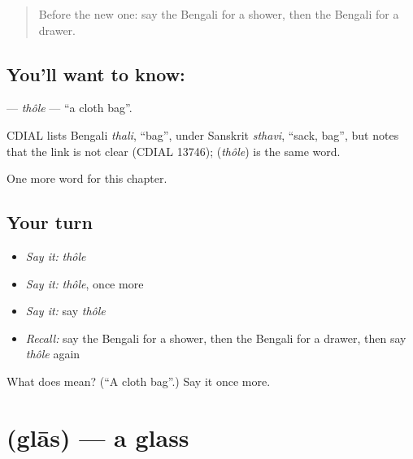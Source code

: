 \label{lesson:BN-C201-thole}



\begin{quote}
Before the new one: say the Bengali for a shower, then the Bengali for a drawer.
\end{quote}

\subsection*{You'll want to know: }
\textbf{} — \emph{thôle} — \textquotedblleft{}a cloth bag\textquotedblright{}.

\begin{cousinweb}
CDIAL lists Bengali \emph{thali}, \textquotedblleft{}bag\textquotedblright{}, under Sanskrit \emph{sthavi}, \textquotedblleft{}sack, bag\textquotedblright{}, but notes that the link is not clear (CDIAL 13746); \textbf{} (\emph{thôle}) is the same word.
\end{cousinweb}

\begin{grammarlens}[title={What you've built}]
One more word for this chapter.
\end{grammarlens}

\subsection*{Your turn}
\begin{itemize}
\raggedright
  \item \emph{Say it:} \emph{thôle}
  \item \emph{Say it:} \emph{thôle}, once more
  \item \emph{Say it:} say \emph{thôle}
  \item \emph{Recall:} say the Bengali for a shower, then the Bengali for a drawer, then say \emph{thôle} again
\end{itemize}

\begin{tcolorbox}[breakable,colback=teal!4,colframe=teal!35!black,title={Before you move on}]
What does  mean? (\textquotedblleft{}A cloth bag\textquotedblright{}.) Say it once more.
\end{tcolorbox}
\section[\texorpdfstring{\bn{গ্লাস} (glās)}{গ্লাস (glās)}]{ (glās) — a glass}

